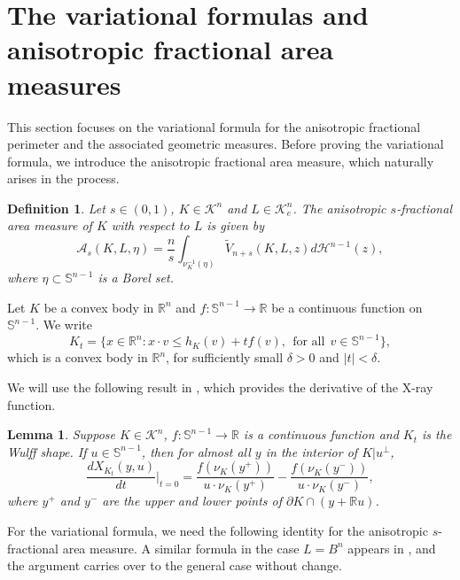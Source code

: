 \documentclass[12pt, oneside,reqno]{amsart}
\numberwithin{equation}{section}
\newtheorem{definition}[theorem]{Definition}
\newtheorem{lemma}[theorem]{Lemma}
\newtheorem{definition and theorem}[theorem]{Definition and Theorem}
\theoremstyle{plain}
\theoremstyle{remark}
\theoremstyle{definition}
\newcommand{\sn}{{\mathbb S}^{n-1}}
\newcommand{\tr}{\mathbb R}
\newcommand{\rn}{\mathbb R^n}
\newcommand{\tk}{\mathcal{K}}
\newcommand{\tH}{\mathcal{H}}
\begin{document}

\section{The variational formulas and anisotropic fractional area measures}

This section focuses on the variational formula for the anisotropic fractional perimeter and the associated geometric measures. Before proving the variational formula, we introduce the anisotropic fractional area measure, which naturally arises in the process.

\begin{definition}
    Let $s\in(0,1)$, $K\in\tk^n$ and $L\in\tk_e^n$. The anisotropic $s$-fractional area measure of $K$ with respect to $L$ is given by
\[\mathcal{A}_s(K,L,\eta)=\frac{n}{s}\int_{\nu_K^{-1}(\eta)}\tilde{V}_{n+s}(K,L,z)d\tH^{n-1}(z),\]
where $\eta\subset \sn$ is a Borel set.
\end{definition}


Let $K$ be a convex body in $\rn$ and $f:\sn\rightarrow \tr$ be a continuous function on $\sn$. We write
\begin{equation}\label{Wulff Shape}
    K_t=\{x\in\rn:  x\cdot v \leq h_K(v)+tf(v),~~\text{for all}~~v\in\sn\},
\end{equation}
which is a convex body in $\rn$, for sufficiently small $\delta>0$ and $|t|<\delta$.

We will use the following result in \cite{LXYZ2020}, which provides the derivative of the X-ray function.


\begin{lemma}\cite[Lemma 5.2]{LXYZ2020}\label{XLYZ} Suppose $K\in\tk^n$, $f:\sn\rightarrow \tr$ is a continuous function and $K_t$ is the Wulff shape. If $u\in\sn$, then for almost all $y$ in the interior of $K|u^{\perp}$,
\[\frac{dX_{K_t}(y,u)}{dt}\Big|_{t=0}=\frac{f(\nu_K(y^+))}{u\cdot\nu_K(y^+)}-\frac{f(\nu_K(y^-))}{u\cdot \nu_K(y^-)},\]
where $y^+$ and $y^-$ are the upper and lower points of $\partial K\cap (y+\tr u)$.
\end{lemma}

For the variational formula, we need the following identity for the anisotropic $s$-fractional area measure. A similar formula in the case $L = B^n$ appears in \cite{LXYZ2020}, and the argument carries over to the general case without change.
\end{document}
